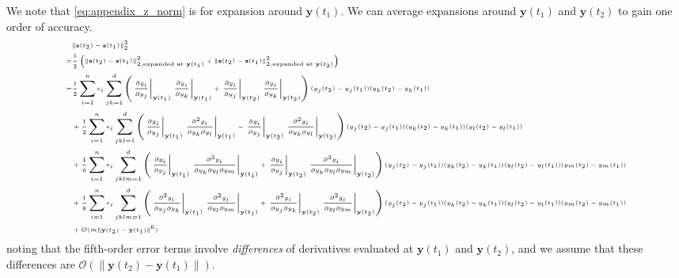 We note that \eqref{eq:appendix_z_norm} is for expansion around $\mathbf{y}(t_1)$. 
%
We can average expansions around $\mathbf{y}(t_1)$ and $\mathbf{y}(t_2)$ to gain one order of accuracy. 
%
\begin{equation} \label{eq:mahalanobis_taylor_explansion}
\tiny
\begin{aligned}
& \|\mathbf{z}(t_2) - \mathbf{z}(t_1)\|_2^2 \\
=& \frac{1}{2} \left( \|\mathbf{z}(t_2) - \mathbf{z}(t_1)\|_{2, \text{expanded at } \mathbf{y}(t_1)}^2  + \|\mathbf{z}(t_2) - \mathbf{z}(t_1)\|_{2, \text{expanded at } \mathbf{y}(t_2)}^2 \right) \\
=& \frac{1}{2} \sum_{i=1}^n e_i \sum_{jk=1}^d \left( \left. \frac{\partial g_i}{\partial y_j} \right|_{\mathbf{y}(t_1)} \left. \frac{\partial g_i}{\partial y_k} \right|_{\mathbf{y}(t_1)} + \left. \frac{\partial g_i}{\partial y_j} \right|_{\mathbf{y}(t_2)} \left. \frac{\partial g_i}{\partial y_k} \right|_{\mathbf{y}(t_2)} \right) (y_j(t_2)-y_j(t_1)) (y_k(t_2)-y_k(t_1)) \\
&+ \frac{1}{2} \sum_{i=1}^n e_i \sum_{jkl=1}^d \left( \left. \frac{\partial g_i}{\partial y_j} \right|_{\mathbf{y}(t_1)} \left. \frac{\partial^2 g_i}{\partial y_k \partial y_l} \right|_{\mathbf{y}(t_1)} - \left. \frac{\partial g_i}{\partial y_j} \right|_{\mathbf{y}(t_2)} \left. \frac{\partial^2 g_i}{\partial y_k \partial y_l} \right|_{\mathbf{y}(t_2)} \right) (y_j(t_2)-y_j(t_1))  (y_k(t_2)-y_k(t_1)) (y_l(t_2)-y_l(t_1)) \\
&+ \frac{1}{6} \sum_{i=1}^n e_i \sum_{jklm=1}^d \left( \left. \frac{\partial g_i}{\partial y_j} \right|_{\mathbf{y}(t_1)} \left. \frac{\partial^3 g_i}{ \partial y_k \partial y_l \partial y_m} \right|_{\mathbf{y}(t_1)} + \left. \frac{\partial g_i}{\partial y_j} \right|_{\mathbf{y}(t_2)} \left. \frac{\partial^3 g_i}{ \partial y_k \partial y_l \partial y_m} \right|_{\mathbf{y}(t_2)} \right) (y_j(t_2)-y_j(t_1)) (y_k(t_2)-y_k(t_1)) (y_l(t_2)-y_l(t_1))(y_m(t_2)-y_m(t_1)) \\
&+ \frac{1}{8} \sum_{i=1}^n e_i \sum_{jklm=1}^d \left( \left. \frac{\partial^2 g_i}{\partial y_j \partial y_k} \right|_{\mathbf{y}(t_1)} \left. \frac{\partial^2 g_i}{\partial y_l \partial y_m} \right|_{\mathbf{y}(t_1)} + \left. \frac{\partial^2 g_i}{\partial y_j \partial y_k} \right|_{\mathbf{y}(t_2)} \left. \frac{\partial^2 g_i}{\partial y_l \partial y_m} \right|_{\mathbf{y}(t_2)} \right) (y_j(t_2)-y_j(t_1)) (y_k(t_2)-y_k(t_1)) (y_l(t_2)-y_l(t_1)) (y_m(t_2)-y_m(t_1)) \\
&+ \mathcal{O}(m \|\mathbf{y}(t_2) - \mathbf{y}(t_1) \|^6)
\end{aligned}
\end{equation}
%
noting that the fifth-order error terms involve {\em differences} of derivatives evaluated at $\mathbf{y}(t_1)$ and $\mathbf{y}(t_2)$, and we assume that these differences are $\mathcal{O} (\| \mathbf{y}(t_2) - \mathbf{y}(t_1) \|)$. 

